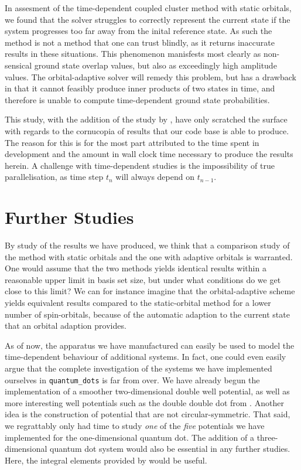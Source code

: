 In assesment of the time-dependent coupled cluster method with static orbitals,
we found that the solver struggles to correctly represent the current state if 
the system progresses too far away from the inital reference state. As such the 
method is not a method that one can trust blindly, as it returns
inaccurate results in these situations. This phenomenon manisfests most clearly as 
non-sensical ground state overlap values, but also as exceedingly high amplitude 
values. The orbital-adaptive solver will remedy this problem, but has a drawback 
in that it cannot feasibly produce inner products of two states in time, and therefore 
is unable to compute time-dependent ground state probabilities.

This study, with the addition of the study by \citeauthor{islandwind2019}\cite{islandwind2019},
have only scratched the surface with regards to the cornucopia of results that our 
code base is able to produce. The reason for this is for the most part attributed to 
the time spent in development and the amount in wall clock time necessary to 
produce the results herein. A challenge with time-dependent studies is the 
impossibility of true parallelisation, as time step $t_n$ will always depend 
on $t_{n-1}$.

\section{Further Studies}

By study of the results we have produced, we think that a comparison study 
of the method with static orbitals and the one with adaptive orbitals is warranted.
One would assume that the two methods yields identical results within a reasonable 
upper limit in basis set size, but under what conditions do we get close to this
limit? We can for instance imagine that the orbital-adaptive scheme yields equivalent
results compared to the static-orbital method for a lower number of spin-orbitals,
because of the automatic adaption to the current state that an orbital adaption 
provides.

As of now, the apparatus we have manufactured can easily be used to model 
the time-dependent behaviour of additional systems. In fact, one could even 
easily argue that the complete investigation of the systems we have implemented 
ourselves in \lstinline{quantum_dots} is far from over. We have already begun
the implementation of a smoother two-dimensional double well potential, as well as 
more interesting well potentials such as the double double dot 
from \citeauthor{nielsen2012configuration}\cite{nielsen2012configuration}. Another 
idea is the construction of potential that are not circular-symmetric.
That said, we regrattably only had time to study \emph{one} of the
\emph{five} potentials we have implemented for the one-dimensional quantum dot.
The addition of a three-dimensional quantum dot system would also be essential 
in any further studies. Here, the integral elements provided by
\citeauthor{vorrath2003electronic}\cite{vorrath2003electronic} would be useful.

